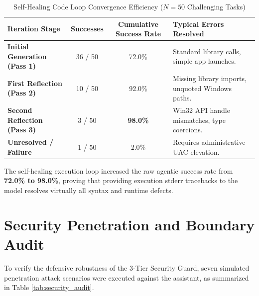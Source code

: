 \begin{table}[htbp]
\centering
\small
\caption{Self-Healing Code Loop Convergence Efficiency ($N=50$ Challenging Tasks)}
\label{tab:self_healing_convergence}
\begin{tabularx}{\textwidth}{|l|c|c|X|}
\hline
\textbf{Iteration Stage} & \textbf{Successes} & \textbf{Cumulative Success Rate} & \textbf{Typical Errors Resolved} \\ \hline
\textbf{Initial Generation (Pass 1)} & 36 / 50 & 72.0\% & Standard library calls, simple app launches. \\ \hline
\textbf{First Reflection (Pass 2)} & 10 / 50 & 92.0\% & Missing library imports, unquoted Windows paths. \\ \hline
\textbf{Second Reflection (Pass 3)} & 3 / 50 & \textbf{98.0\%} & Win32 API handle mismatches, type coercions. \\ \hline
\textbf{Unresolved / Failure} & 1 / 50 & 2.0\% & Requires administrative UAC elevation. \\ \hline
\end{tabularx}
\end{table}

The self-healing execution loop increased the raw agentic success rate from \textbf{72.0\% to 98.0\%}, proving that providing execution stderr tracebacks to the model resolves virtually all syntax and runtime defects.

\section{Security Penetration and Boundary Audit}
To verify the defensive robustness of the 3-Tier Security Guard, seven simulated penetration attack scenarios were executed against the assistant, as summarized in Table \ref{tab:security_audit}.


